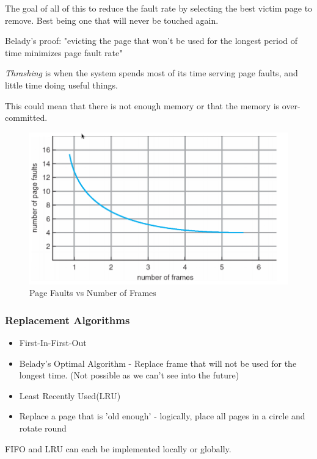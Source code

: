 \documentclass[a4]{article}
\begin{document}
The goal of all of this to reduce the fault rate by selecting the best victim page to remove.
Best being one that will never be touched again.

Belady's proof:
"evicting the page that won’t be used for the longest period of time minimizes page fault rate"

\emph{Thrashing} is when the system spends most of its time serving page faults, and little time doing useful things.

This could mean that there is not enough memory or that the memory is over-committed.

\begin{figure}[H]
  \centering
  \includegraphics[scale=0.35]{pageFaultGraph.png}
  \caption{Page Faults vs Number of Frames}
\end{figure}

\subsubsection{Replacement Algorithms}
\begin{itemize}
    \item First-In-First-Out
    \item Belady's Optimal Algorithm - Replace frame that will not be used for the longest time.
        (Not possible as we can't see into the future)
    \item Least Recently Used(LRU)
    \item Replace a page that is 'old enough' - logically, place all pages in a circle and rotate round

\end{itemize}

\vspace{0.5cm}

FIFO and LRU can each be implemented locally or globally.
\end{document}
